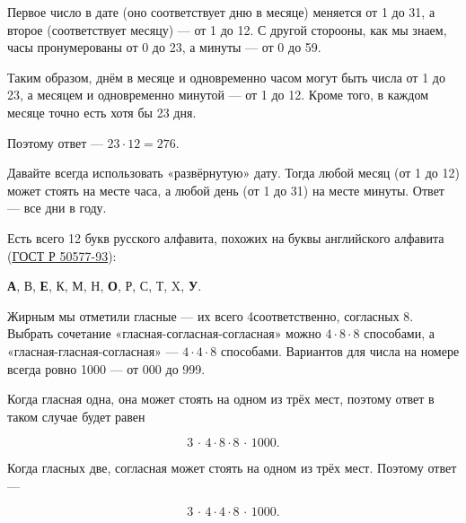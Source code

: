 \begin{itemize}
\itA Первое число в дате (оно соответствует дню в месяце) меняется от 1 до 31, а второе (соответствует месяцу) — от 1 до 12. С другой сторооны, как мы знаем, часы пронумерованы от 0 до 23, а минуты — от 0 до 59.

\ms Таким образом, днём в месяце и одновременно часом могут быть числа от 1 до 23, а месяцем и одновременно минутой — от 1 до 12. Кроме того, в каждом месяце точно есть хотя бы 23 дня.

\ms Поэтому ответ — $23 \cdot 12 = 276$.

\itB Давайте всегда использовать «развёрнутую» дату. Тогда любой месяц (от 1 до 12) может стоять на месте часа, а любой день (от 1 до 31) на месте минуты. Ответ — все дни в году.

\itC Есть всего 12 букв русского алфавита, похожих на буквы английского алфавита (\href{http://base.garant.ru/12142212}{ГОСТ Р 50577-93}): \medskip

\centerline{{\bf А}, В, {\bf Е}, К, М, Н, {\bf О}, Р, С, Т, X, {\bf У}.}

\ms Жирным мы отметили гласные — их всего 4\scolon соответственно, согласных 8. Выбрать сочетание «гласная-согласная-согласная» можно $4 \cdot 8 \cdot 8$ способами, а «гласная-гласная-согласная» — $4 \cdot 4 \cdot 8$ способами. Вариантов для числа на номере всегда ровно 1000 — от 000 до 999.

\ms Когда гласная одна, она может стоять на одном из трёх мест, поэтому ответ в таком случае будет равен

$$3\,\cdot\,4\cdot8\cdot8\,\cdot\,1000.$$

\ms Когда гласных две, согласная может стоять на одном из трёх мест. Поэтому ответ —

$$3\,\cdot\,4\cdot4\cdot8\,\cdot\,1000.$$
\end{itemize}